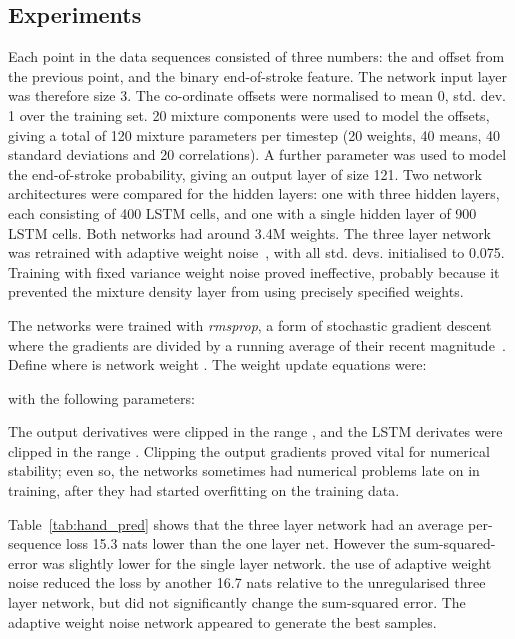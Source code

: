 \documentclass{article}
\newcommand{\tref}[1]{Table~\ref{tab:#1}}
\begin{document}
\subsection{Experiments}
Each point in the data sequences consisted of three numbers: the  and  offset from the previous point, and the binary end-of-stroke feature.
The network input layer was therefore size 3.
The co-ordinate offsets were normalised to mean 0, std. dev. 1 over the training set.
20 mixture components were used to model the offsets, giving a total of 120 mixture parameters per timestep (20 weights, 40 means, 40 standard deviations and 20 correlations).
A further parameter was used to model the end-of-stroke probability, giving an output layer of size 121.
Two network architectures were compared for the hidden layers: one with three hidden layers, each consisting of 400 LSTM cells, and one with a single hidden layer of 900 LSTM cells.
Both networks had around 3.4M weights.
The three layer network was retrained with adaptive weight noise~\cite{graves11nips}, with all std. devs. initialised to 0.075.
Training with fixed variance weight noise proved ineffective, probably because it prevented the mixture density layer from using precisely specified weights.

The networks were trained with \emph{rmsprop}, a form of stochastic gradient descent where the gradients are divided by a running average of their recent magnitude~\cite{tieleman12rms}.
Define  where  is network weight . The weight update equations were:

with the following parameters:

The output derivatives  were clipped in the range , and the LSTM derivates were clipped in the range .
Clipping the output gradients proved vital for numerical stability; even so, the networks sometimes had numerical problems late on in training, after they had started overfitting on the training data.

\tref{hand_pred} shows that the three layer network had an average per-sequence loss 15.3 nats lower than the one layer net.
However the sum-squared-error was slightly lower for the single layer network.
the use of adaptive weight noise reduced the loss by another 16.7 nats relative to the unregularised three layer network, but did not significantly change the sum-squared error.
The adaptive weight noise network appeared to generate the best samples.
\end{document}
